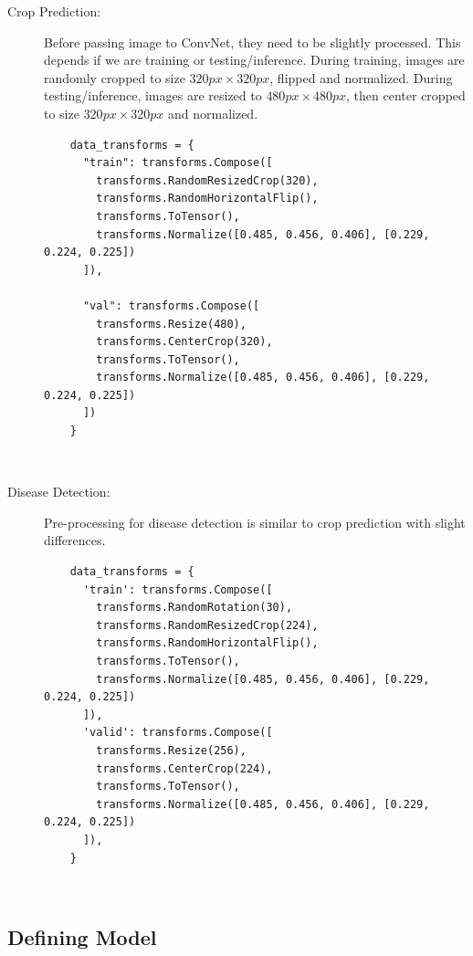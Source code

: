 \documentclass[../Report.tex]{subfiles}
\begin{document}
\begin{description}
  \item[Crop Prediction:] Before passing image to ConvNet, they need to be slightly processed. This depends if we are training or 
  testing/inference. During training, images are randomly cropped to size $320px \times 320px$, flipped and normalized. 
  During testing/inference, images are resized to $480px \times 480px$, then center cropped to size $320px \times 320px$ and normalized.

  \begin{verbatim}
    data_transforms = {
      "train": transforms.Compose([
        transforms.RandomResizedCrop(320),
        transforms.RandomHorizontalFlip(),
        transforms.ToTensor(),
        transforms.Normalize([0.485, 0.456, 0.406], [0.229, 0.224, 0.225])
      ]),
      
      "val": transforms.Compose([
        transforms.Resize(480),
        transforms.CenterCrop(320),
        transforms.ToTensor(),
        transforms.Normalize([0.485, 0.456, 0.406], [0.229, 0.224, 0.225])
      ])
    }
  \end{verbatim}
   ~\par

  \item[Disease Detection:] Pre-processing for disease detection is similar to crop prediction with slight differences.
  
  \begin{verbatim}
    data_transforms = {
      'train': transforms.Compose([
        transforms.RandomRotation(30),
        transforms.RandomResizedCrop(224),
        transforms.RandomHorizontalFlip(),
        transforms.ToTensor(),
        transforms.Normalize([0.485, 0.456, 0.406], [0.229, 0.224, 0.225])
      ]),
      'valid': transforms.Compose([
        transforms.Resize(256),
        transforms.CenterCrop(224),
        transforms.ToTensor(),
        transforms.Normalize([0.485, 0.456, 0.406], [0.229, 0.224, 0.225])
      ]),
    }
  \end{verbatim}
   ~\par

\end{description}

\subsection{Defining Model}
\end{document}
